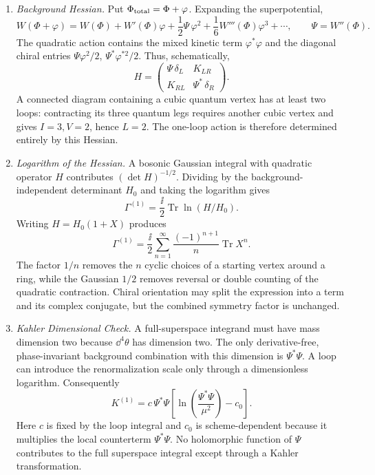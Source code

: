 \begin{enumerate}
  \begin{enumerate}
    \item \emph{Background Hessian.}
    Put \(\Phi_{\rm total}=\Phi+\varphi\).  Expanding the superpotential,
      \[
        W(\Phi+\varphi)
          =W(\Phi)+W'(\Phi)\varphi
           +\frac12\Psi\,\varphi^2
           +\frac16W'''(\Phi)\varphi^3+\cdots,
        \qquad \Psi=W''(\Phi).
      \]
      The quadratic action contains the mixed kinetic term
      \(\varphi^*\varphi\) and the diagonal chiral entries
      \(\Psi\varphi^2/2\), \(\Psi^*\varphi^{*2}/2\).  Thus, schematically,
      \[
        H=
        \begin{pmatrix}
          \Psi\,\delta_L & K_{LR}\\
          K_{RL} & \Psi^*\,\delta_R
        \end{pmatrix}.
      \]
      A connected diagram containing a cubic quantum vertex has at least
      two loops: contracting its three quantum legs requires another cubic
      vertex and gives \(I=3,V=2\), hence \(L=2\).  The one-loop action is
      therefore determined entirely by this Hessian.
    \item \emph{Logarithm of the Hessian.}
    A bosonic Gaussian integral with quadratic operator \(H\) contributes
      \((\det H)^{-1/2}\).  Dividing by the background-independent
      determinant \(H_0\) and taking the logarithm gives
      \[
        \Gamma^{(1)}
          =\frac{\ii}{2}\operatorname{Tr}\ln(H/H_0).
      \]
      Writing \(H=H_0(1+X)\) produces
      \[
        \Gamma^{(1)}
          =\frac{\ii}{2}\sum_{n=1}^{\infty}
           \frac{(-1)^{n+1}}n\operatorname{Tr}X^n .
      \]
      The factor \(1/n\) removes the \(n\) cyclic choices of a starting
      vertex around a ring, while the Gaussian \(1/2\) removes reversal or
      double counting of the quadratic contraction.  Chiral orientation
      may split the expression into a term and its complex conjugate, but
      the combined symmetry factor is unchanged.
    \item \emph{Kahler Dimensional Check.}
    A full-superspace integrand must have mass dimension two because
      \(\dd^4\theta\) has dimension two.  The only derivative-free,
      phase-invariant background combination with this dimension is
      \(\Psi^*\Psi\).  A loop can introduce the renormalization scale only
      through a dimensionless logarithm.  Consequently
      \[
        K^{(1)}
          =c\,\Psi^*\Psi
           \left[
             \ln\!\left(\frac{\Psi^*\Psi}{\mu^2}\right)-c_0
           \right].
      \]
      Here \(c\) is fixed by the loop integral and \(c_0\) is
      scheme-dependent because it multiplies the local counterterm
      \(\Psi^*\Psi\).  No holomorphic function of \(\Psi\) contributes to
      the full superspace integral except through a Kahler transformation.
  \end{enumerate}


\end{enumerate}
